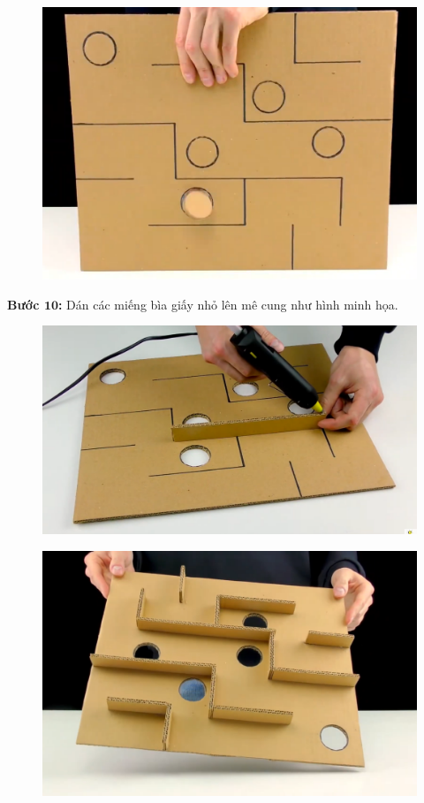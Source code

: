 \begin{multicols}{2}
\begin{figure}[H]
		\vspace*{1pt}
		\includegraphics[width= 0.8\linewidth]{15}
		\vspace*{-10pt}
	\end{figure}
	\textbf{\color{toancuabi}Bước $\pmb{10}$:} Dán các miếng bìa giấy nhỏ lên mê cung như hình minh họa.
	\begin{figure}[H]
		\vspace*{-5pt}
		\centering
		\captionsetup{labelformat= empty, justification=centering}
		\includegraphics[width= 0.8\linewidth]{16}
		\vspace*{-5pt}
	\end{figure}
		\begin{figure}[H]
		\vspace*{5pt}
		\centering
		\captionsetup{labelformat= empty, justification=centering}
		\includegraphics[width= 0.8\linewidth]{17}

\end{figure}
\end{multicols}

